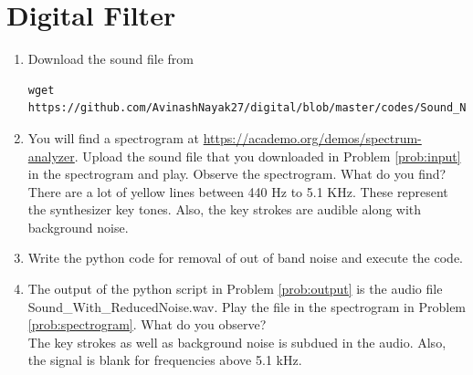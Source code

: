 \documentclass[journal,12pt,twocolumn]{IEEEtran}
\renewcommand\thesection{\arabic{section}}
\begin{document}
\section{Digital Filter}
\begin{enumerate}[label=\thesection.\arabic*
,ref=\thesection.\theenumi]
\item
\label{prob:input}
Download the sound file from  
\begin{lstlisting}
wget https://github.com/AvinashNayak27/digital/blob/master/codes/Sound_Noise.wav
\end{lstlisting}
\item
\label{prob:spectrogram}
You will find a spectrogram at \href{https://academo.org/demos/spectrum-analyzer}{\url{https://academo.org/demos/spectrum-analyzer}}. 
%
Upload the sound file that you downloaded in Problem \ref{prob:input} in the spectrogram  and play.  Observe the spectrogram. What do you find?
\\
%
\solution There are a lot of yellow lines between 440 Hz to 5.1 KHz.  These represent the synthesizer key tones. Also, the key strokes
are audible along with background noise.
\item
\label{prob:output}
Write the python code for removal of out of band noise and execute the code.
\\
\solution

%
\item
The output of the python script in Problem \ref{prob:output} is the audio file Sound\_With\_ReducedNoise.wav. Play the file in the spectrogram in Problem \ref{prob:spectrogram}. What do you observe?
\\
\solution The key strokes as well as background noise is subdued in the audio.  Also,  the signal is blank for frequencies above 5.1 kHz.

\end{enumerate}
\end{document}
